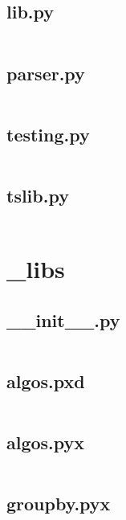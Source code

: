 \documentclass{article}
\begin{document}
\subsection{lib.py}
\inputminted{python}{/home/dufferzafar/dev/@clones/pandas/pandas/lib.py}
\newpage

\subsection{parser.py}
\inputminted{python}{/home/dufferzafar/dev/@clones/pandas/pandas/parser.py}
\newpage

\subsection{testing.py}
\inputminted{python}{/home/dufferzafar/dev/@clones/pandas/pandas/testing.py}
\newpage

\subsection{tslib.py}
\inputminted{python}{/home/dufferzafar/dev/@clones/pandas/pandas/tslib.py}
\newpage

\section{\_libs}

\subsection{\_\_init\_\_.py}
\inputminted{python}{/home/dufferzafar/dev/@clones/pandas/pandas/_libs/__init__.py}
\newpage

\subsection{algos.pxd}
\inputminted{cython}{/home/dufferzafar/dev/@clones/pandas/pandas/_libs/algos.pxd}
\newpage

\subsection{algos.pyx}
\inputminted{cython}{/home/dufferzafar/dev/@clones/pandas/pandas/_libs/algos.pyx}
\newpage

\subsection{groupby.pyx}
\inputminted{cython}{/home/dufferzafar/dev/@clones/pandas/pandas/_libs/groupby.pyx}
\newpage
\end{document}
